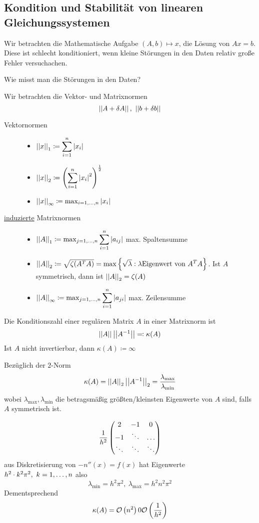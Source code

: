 \documentclass[../Skript.tex]{subfiles}
\begin{document}
\subsection{Kondition und Stabilität von linearen Gleichungssystemen}
Wir betrachten die Mathematische Aufgabe $(A,b) \mapsto x$, die Lösung von $Ax=b$.
Diese ist schlecht konditioniert, wenn kleine Störungen in den Daten relativ große Fehler versuchachen.
\begin{question}
    Wie misst man die Störungen in den Daten?
\end{question}
Wir betrachten die Vektor- und Matrixnormen \[
    \left\vert\left\vert A+\delta A\right\vert\right\vert, \ \left\vert\left\vert b+\delta b\right\vert\right\vert\]
\begin{description}
    \item[Vektornormen]\hfill\begin{itemize}
        \item $\left\vert\left\vert x\right\vert\right\vert_1 \coloneqq \displaystyle\sum_{i=1}^n \left\vert x_i \right\vert$
        \item $\left\vert\left\vert x\right\vert\right\vert_2 \coloneqq \left(\displaystyle\sum_{i=1}^n \left\vert x_i \right\vert^2\right)^{\frac{1}{2}}$
        \item $\dabs{x}_\infty \coloneqq \max_{\igb i 1 n}\abs{x_i}$
    \end{itemize} 
    \item[\underline{induzierte} Matrixnormen]\hfill\begin{itemize}
        \item $\dabs{A}_1 \coloneqq \max_{\igb j 1 n}\dsum_{i=1}^n \abs{a_{ij}}$ max. Spaltensumme
        \item $\left\vert\left\vert A\right\vert\right\vert_2 \coloneqq \sqrt{\zeta(A^T A)} = \max\left\{ \sqrt{\lambda}: \lambda \text{Eigenwert von }A^TA \right\}$.
        Ist $A$ symmetrisch, dann ist $\left\vert\left\vert A\right\vert\right\vert_2 = \zeta(A)$
        \item $\dabs{A}_\infty \coloneqq \max_{\igb j 1 n}\dsum_{i=1}^n\abs{a_{ji}}$ max. Zeilensumme
    \end{itemize}
\end{description}
\begin{definition}
    Die Konditionszahl einer regulären Matrix $A$ in einer Matrixnorm ist \[
        \left\vert\left\vert A\right\vert\right\vert\left\vert\left\vert A^{-1}\right\vert\right\vert \eqqcolon \kappa(A)\]
    Ist $A$ nicht invertierbar, dann $\kappa(A) \coloneqq \infty$
\end{definition}
\begin{remark}
    Bezüglich der $2$-Norm \[
        \kappa(A) = \left\vert\left\vert A\right\vert\right\vert_2\left\vert\left\vert A^{-1}\right\vert\right\vert_2 = \frac{\lambda_{\max}}{\lambda_{\min}}\]
        wobei $\lambda_{\max}, \lambda_{\min}$ die betragsmäßig größten/kleinsten Eigenwerte
        von $A$ sind, falls $A$ symmetrisch ist.
\end{remark}
\begin{example}
    \[
        \frac{1}{h^2}\begin{pmatrix}
            2&-1&0\\-1&\ddots & \dots\\
            \ddots& \ddots&\ddots
        \end{pmatrix}\]
    aus Diskretisierung von $-n''(x) = f(x)$ hat Eigenwerte $h^2\cdot k^2\pi^2, \ \igb k 1 n$
    also \[
        \lambda_{\min} = h^2\pi^2, \ \lambda_{\max} = h^2n^2\pi^2\] 
    Dementsprechend \[
        \kappa(A) = \calO{n^2} 0 \calO{\frac{1}{h^2}}\]
\end{example}
\end{document}
